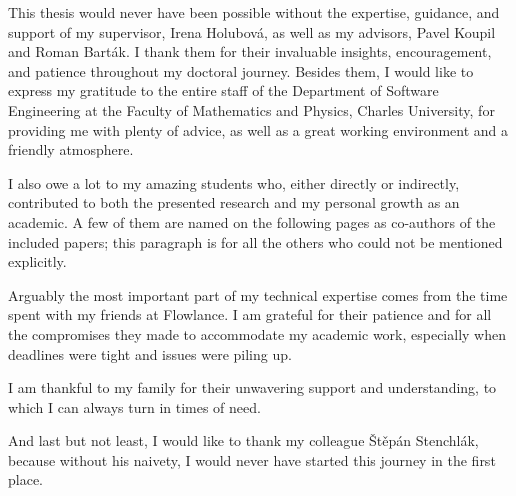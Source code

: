 \noindent
This thesis would never have been possible without the expertise, guidance, and support of my supervisor, Irena Holubová, as well as my advisors, Pavel Koupil and Roman Barták. I thank them for their invaluable insights, encouragement, and patience throughout my doctoral journey. Besides them, I would like to express my gratitude to the entire staff of the Department of Software Engineering at the Faculty of Mathematics and Physics, Charles University, for providing me with plenty of advice, as well as a great working environment and a friendly atmosphere.

I also owe a lot to my amazing students who, either directly or indirectly, contributed to both the presented research and my personal growth as an academic. A few of them are named on the following pages as co-authors of the included papers; this paragraph is for all the others who could not be mentioned explicitly.

Arguably the most important part of my technical expertise comes from the time spent with my friends at Flowlance. I am grateful for their patience and for all the compromises they made to accommodate my academic work, especially when deadlines were tight and issues were piling up.

I am thankful to my family for their unwavering support and understanding, to which I can always turn in times of need.

And last but not least, I would like to thank my colleague Štěpán Stenchlák, because without his naivety, I would never have started this journey in the first place.
